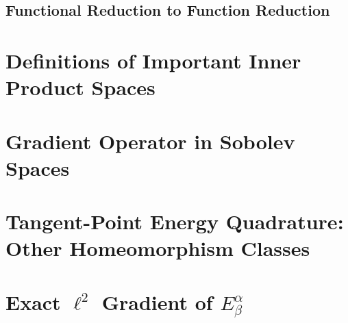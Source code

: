 \documentclass[a4paper, 12pt]{article}
\numberwithin{equation}{section}
\numberwithin{figure}{section}
\theoremstyle{definition}
\theoremstyle{plain}
\theoremstyle{plain}
\theoremstyle{plain}
\theoremstyle{remark}
\numberwithin{theorem}{section}
\theoremstyle{definition}
\begin{document}
\subsection{Functional Reduction to Function Reduction}


\newpage
\begin{appendices}
    \section{Definitions of Important Inner Product Spaces}
    \label{sct: Definitions of Important Inner Product Spaces}
    
    \section{Gradient Operator in Sobolev Spaces}
    \label{sct: Integration By Parts}
    
    \section{Tangent-Point Energy Quadrature: Other Homeomorphism Classes}
    \label{sct: Other Homeomorphism Classes}
    
    \section{Exact $\ell^2$ Gradient of $E_{\beta}^{\alpha}$}
    \label{sct: Exact Gradient}
    
\end{appendices}

\printbibliography
\end{document}
